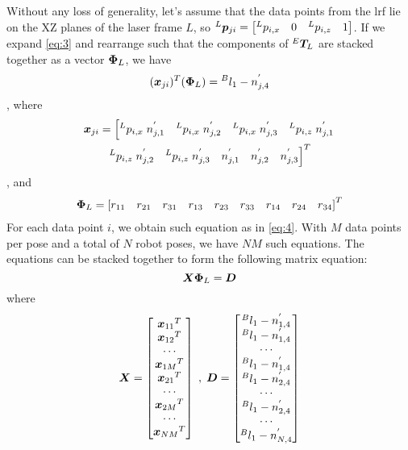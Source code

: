 Without any loss of generality, let's assume that the data points from the \ac{lrf} lie on the XZ planes of the laser frame $L$, so ${^L}\vb*{p}_{ji} = \left[{^L}p_{i,x} \quad 0 \quad {^L}p_{i,z}\quad 1\right]$. If we expand \eqref{eq:3} and rearrange such that the components of ${^E}\vb*{T}_L$ are stacked together as a vector $\vb*{\Phi}_L$, we have
\begin{equation}
\label{eq:4}
  (\vb*{x}_{ji})  ^T (\vb*{\Phi}_L) = {^B}l_1 -  n^{'}_{j,4}
\end{equation}
, where 
\begin{multline}
  \vb*{x}_{ji} = \left[{^L}p_{i,x}\;n^{'}_{j,1} \quad {^L}p_{i,x}\;n^{'}_{j,2}\quad {^L}p_{i,x}\;n^{'}_{j,3}\quad  {^L}p_{i,z}\;n^{'}_{j,1}\right. \\ 
\left. {^L}p_{i,z}\;n^{'}_{j,2}\quad {^L}p_{i,z}\;n^{'}_{j,3} \quad n^{'}_{j,1} \quad n^{'}_{j,2} \quad n^{'}_{j,3} \right]^T
\end{multline}, 
and
\begin{multline}
  \vb*{\Phi}_L= \left[r_{11} \quad r_{21} \quad r_{31} \quad r_{13} \quad r_{23} \quad r_{33} \quad r_{14} \quad r_{24}  \quad r_{34} \right] ^T
\end{multline}
For each data point $i$, we obtain such equation as in \eqref{eq:4}. With $M$ data points per pose and a total of $N$ robot poses, we have $NM$ such equations. The equations can be stacked together to form the following matrix equation:
\begin{equation}
\label{eq:7}
  \vb*{X}   \vb*{\Phi}_L= \vb*{D}
\end{equation}
where 
\begin{equation}
\vb*{X} =\begin{bmatrix}
{\vb*{x}_{11}}^T \\ {\vb*{x}_{12}}^T  \\ \cdots\\{\vb*{x}_{1M}}^T \\ {\vb*{x}_{21}}^T \\ \cdots\\ {\vb*{x}_{2M}}^T  \\ \cdots \\ {\vb*{x}_{NM}}^T 
\end{bmatrix} \;, \; \vb*{D} =\begin{bmatrix}
{^B}l_1 -  n^{'}_{1,4} \\ {^B}l_1 -  n^{'}_{1,4}  \\ \cdots\\ {^B}l_1 -  n^{'}_{1,4}  \\ {^B}l_1 -  n^{'}_{2,4} \\ \cdots\\ {^B}l_1 -  n^{'}_{2,4}  \\ \cdots \\{^B}l_1 -  n^{'}_{N,4} 
\end{bmatrix}
\end{equation}
